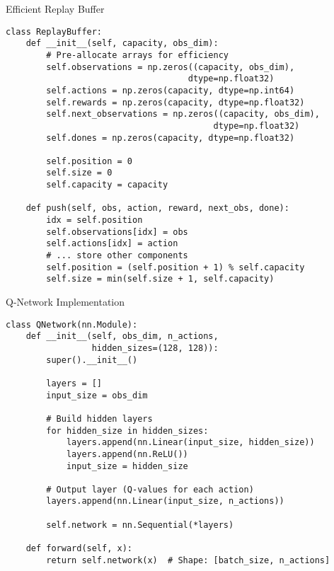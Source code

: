 \documentclass[aspectratio=169,10pt]{beamer}
\begin{document}
\begin{frame}[fragile]{Efficient Replay Buffer}
\begin{lstlisting}
class ReplayBuffer:
    def __init__(self, capacity, obs_dim):
        # Pre-allocate arrays for efficiency
        self.observations = np.zeros((capacity, obs_dim), 
                                    dtype=np.float32)
        self.actions = np.zeros(capacity, dtype=np.int64)
        self.rewards = np.zeros(capacity, dtype=np.float32)
        self.next_observations = np.zeros((capacity, obs_dim), 
                                         dtype=np.float32)
        self.dones = np.zeros(capacity, dtype=np.float32)
        
        self.position = 0
        self.size = 0
        self.capacity = capacity
    
    def push(self, obs, action, reward, next_obs, done):
        idx = self.position
        self.observations[idx] = obs
        self.actions[idx] = action
        # ... store other components
        self.position = (self.position + 1) % self.capacity
        self.size = min(self.size + 1, self.capacity)
\end{lstlisting}

\end{frame}
\begin{frame}[fragile]{Q-Network Implementation}
\begin{lstlisting}
class QNetwork(nn.Module):
    def __init__(self, obs_dim, n_actions, 
                 hidden_sizes=(128, 128)):
        super().__init__()
        
        layers = []
        input_size = obs_dim
        
        # Build hidden layers
        for hidden_size in hidden_sizes:
            layers.append(nn.Linear(input_size, hidden_size))
            layers.append(nn.ReLU())
            input_size = hidden_size
        
        # Output layer (Q-values for each action)
        layers.append(nn.Linear(input_size, n_actions))
        
        self.network = nn.Sequential(*layers)
    
    def forward(self, x):
        return self.network(x)  # Shape: [batch_size, n_actions]
\end{lstlisting}
\end{frame}
\end{document}
